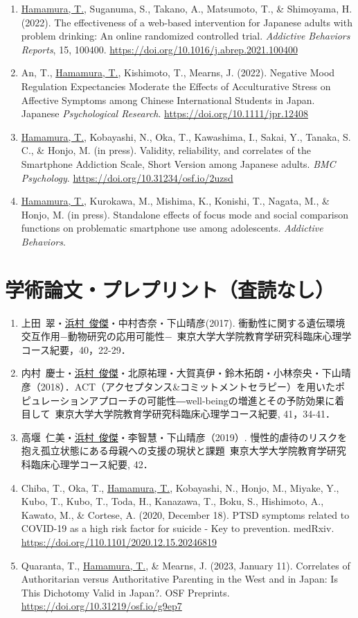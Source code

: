 \documentclass[11pt,a4paper]{article}
\begin{document}
\begin{enumerate}
	\item \underline{Hamamura, T.}, Suganuma, S., Takano, A., Matsumoto, T., \& Shimoyama, H. (2022). The effectiveness of a web-based intervention for Japanese adults with problem drinking: An online randomized controlled trial. \textit{Addictive Behaviors Reports}, 15, 100400. \url{https://doi.org/10.1016/j.abrep.2021.100400}
	\item An, T., \underline{Hamamura, T.}, Kishimoto, T., Mearns, J. (2022). Negative Mood Regulation Expectancies Moderate the Effects of Acculturative Stress on Affective Symptoms among Chinese International Students in Japan. Japanese \textit{Psychological Research}. \url{https://doi.org/10.1111/jpr.12408}
	\item \underline{Hamamura, T.}, Kobayashi, N., Oka, T., Kawashima, I., Sakai, Y., Tanaka, S. C., \& Honjo, M. (in press). Validity, reliability, and correlates of the Smartphone Addiction Scale, Short Version among Japanese adults. \textit{BMC Psychology}. \url{https://doi.org/10.31234/osf.io/2uzsd}
	\item \underline{Hamamura, T.}, Kurokawa, M., Mishima, K., Konishi, T., Nagata, M., \& Honjo, M. (in press). Standalone effects of focus mode and social comparison functions on problematic smartphone use among adolescents. \textit{Addictive Behaviors}.
\end{enumerate}

\section{学術論文・プレプリント（査読なし）}
\begin{enumerate}
	\item 上田\ 翠・\underline{浜村\ 俊傑}・中村杏奈・下山晴彦(2017). 衝動性に関する遺伝環境交互作用−動物研究の応用可能性−\ 東京大学大学院教育学研究科臨床心理学コース紀要，40，22-29．
	\item 内村\ 慶士・\underline{浜村\ 俊傑}・北原祐理・大賀真伊・鈴木拓朗・小林奈央・下山晴彦（2018）．ACT（アクセプタンス\&コミットメントセラピー）を用いたポピュレーションアプローチの可能性―well-beingの増進とその予防効果に着目して\ 東京大学大学院教育学研究科臨床心理学コース紀要, 41，34-41．
	\item 高堰\ 仁美・\underline{浜村\ 俊傑}・李智慧・下山晴彦（2019）. 慢性的虐待のリスクを抱え孤立状態にある母親への支援の現状と課題\ 東京大学大学院教育学研究科臨床心理学コース紀要, 42．
	\item Chiba, T., Oka, T., \underline{Hamamura, T.}, Kobayashi, N., Honjo, M., Miyake, Y., Kubo, T., Kubo, T., Toda, H., Kanazawa, T., Boku, S., Hishimoto, A., Kawato, M., \& Cortese, A. (2020, December 18). PTSD symptoms related to COVID-19 as a high risk factor for suicide - Key to prevention. medRxiv. \url{https://doi.org/110.1101/2020.12.15.20246819}
	\item Quaranta, T., \underline{Hamamura, T.}, \& Mearns, J. (2023, January 11). Correlates of Authoritarian versus Authoritative Parenting in the West and in Japan: Is This Dichotomy Valid in Japan?. OSF Preprints. \url{https://doi.org/10.31219/osf.io/g9ep7}
\end{enumerate}
\end{document}
